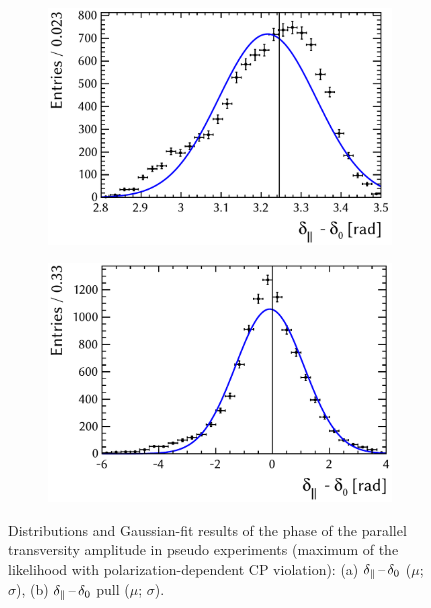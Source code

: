 \begin{figure}[tb]
  \centering
  \begin{subfigure}{0.49\textwidth}
    \includegraphics[width=\textwidth]{graphics/results/parDist_polarDep_AparPhase}
    \caption{}
  \end{subfigure}
  \hfill%
  \begin{subfigure}{0.49\textwidth}
    \includegraphics[width=\textwidth]{graphics/results/pullDist_polarDep_AparPhase}
    \caption{}
  \end{subfigure}

  \caption{Distributions and Gaussian-fit results of the phase of the parallel transversity amplitude in pseudo experiments
           (maximum of the likelihood with polarization-dependent CP violation):
           (a) $\delta_{\parallel\text{}}\,\text{--}\,\delta_\text{0}$ ($\mu$; $\sigma$),
           (b) $\delta_{\parallel\text{}}\,\text{--}\,\delta_\text{0}$ pull ($\mu$\texteq{}; $\sigma$).}
  \label{fig:parDists_parperpPhases}
\end{figure}

